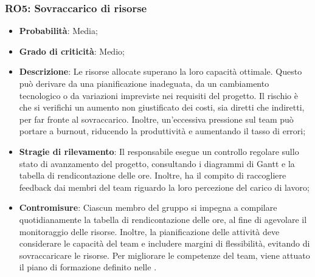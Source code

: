 \subsubsection{RO5: Sovraccarico di risorse}
\begin{itemize}
    \item \textbf{Probabilità}: Media;
    \item \textbf{Grado di criticità}: Medio;
    \item \textbf{Descrizione}: Le risorse allocate superano la loro capacità ottimale. Questo può derivare da una pianificazione inadeguata, da un cambiamento tecnologico o da variazioni impreviste nei requisiti del progetto. Il rischio è che si verifichi un aumento non giustificato dei costi, sia diretti che indiretti, per far fronte al sovraccarico. Inoltre, un'eccessiva pressione sul team può portare a burnout, riducendo la produttività e aumentando il tasso di errori;
    \item \textbf{Stragie di rilevamento}: Il responsabile esegue un controllo regolare sullo stato di avanzamento del progetto, consultando i diagrammi di Gantt e la tabella di rendicontazione delle ore. Inoltre, ha il compito di raccogliere feedback dai membri del team riguardo la loro percezione del carico di lavoro;
    \item \textbf{Contromisure}: Ciascun membro del gruppo si impegna a compilare quotidianamente la tabella di rendicontazione delle ore, al fine di agevolare il monitoraggio delle risorse. Inoltre, la pianificazione delle attività deve considerare le capacità del team e includere margini di flessibilità, evitando di sovraccaricare le risorse. Per migliorare le competenze del team, viene attuato il piano di formazione definito nelle \NormeDiProgetto.
\end{itemize}
